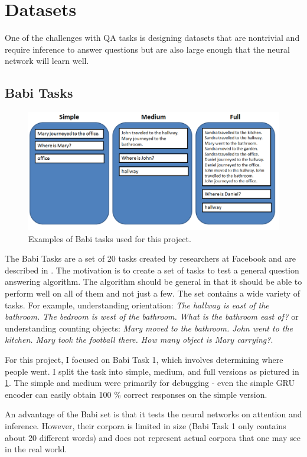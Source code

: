 \documentclass{article}
\begin{document}
\section{Datasets}

One of the challenges with QA tasks is designing datasets that are nontrivial and require inference to answer questions but are also large enough that the neural network will learn well.  

\subsection{Babi Tasks}

\begin{figure}
  \centering
    \includegraphics[width=1\textwidth]{images/babi_tasks}
      \caption{Examples of Babi tasks used for this project.}    
      \label{Fig:babi}
\end{figure}

The Babi Tasks are a set of 20 tasks created by researchers at Facebook and are described in .  The motivation is to create a set of tasks to test a general question answering algorithm.  The algorithm should be general in that it should be able to perform well on all of them and not just a few.  The set contains a wide variety of tasks.  For example, understanding orientation: \textit{The hallway is east of the bathroom.  The bedroom is west of the bathroom.  What is the bathroom east of?} or understanding counting objects: \textit{Mary moved to the bathroom. John went to the kitchen.  Mary took the football there.  How many object is Mary carrying?}.  \par
For this project, I focused on Babi Task 1, which involves determining where people went.  I split the task into simple, medium, and full versions as pictured in \ref{Fig:babi}.  The simple and medium were primarily for debugging - even the simple GRU encoder can easily obtain 100 \% correct responses on the simple version.    \par
An advantage of the Babi set is that it tests the neural networks on attention and inference.  However, their corpora is limited in size (Babi Task 1 only contains about 20 different words) and does not represent actual corpora that one may see in the real world.  
\end{document}
